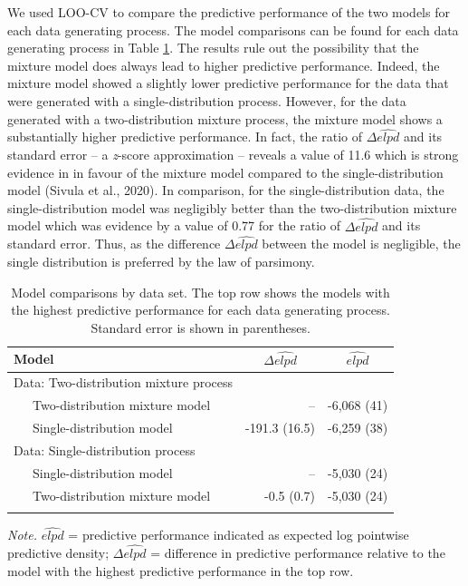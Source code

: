 \documentclass[
  man,floatsintext]{apa7}
\begin{document}
We used LOO-CV to compare the predictive performance of the two models for each data generating process. The model comparisons can be found for each data generating process in Table \ref{tab:loossim}. The results rule out the possibility that the mixture model does always lead to higher predictive performance. Indeed, the mixture model showed a slightly lower predictive performance for the data that were generated with a single-distribution process. However, for the data generated with a two-distribution mixture process, the mixture model shows a substantially higher predictive performance. In fact, the ratio of \(\Delta\widehat{elpd}\) and its standard error -- a \emph{z}-score approximation -- reveals a value of 11.6 which is strong evidence in in favour of the mixture model compared to the single-distribution model (Sivula et al., 2020). In comparison, for the single-distribution data, the single-distribution model was negligibly better than the two-distribution mixture model which was evidence by a value of 0.77 for the ratio of \(\Delta\widehat{elpd}\) and its standard error. Thus, as the difference \(\Delta\widehat{elpd}\) between the model is negligible, the single distribution is preferred by the law of parsimony.

\begin{table}[tbp]

\begin{center}
\begin{threeparttable}

\caption{\label{tab:loossim}Model comparisons by data set. The top row shows the models with the highest predictive performance for each data generating process. Standard error is shown in parentheses.}

\begin{tabular}{lrr}
\toprule
Model & \multicolumn{1}{c}{$\Delta\widehat{elpd}$} & \multicolumn{1}{c}{$\widehat{elpd}$}\\
\midrule
Data: Two-distribution mixture process &  & \\
\ \ \ Two-distribution mixture model & -- & -6,068 (41)\\
\ \ \ Single-distribution model & -191.3 (16.5) & -6,259 (38)\\
Data: Single-distribution process &  & \\
\ \ \ Single-distribution model & -- & -5,030 (24)\\
\ \ \ Two-distribution mixture model & -0.5 (0.7) & -5,030 (24)\\
\bottomrule
\addlinespace
\end{tabular}

\begin{tablenotes}[para]
\normalsize{\textit{Note.} $\widehat{elpd}$ = predictive performance indicated as expected log pointwise predictive density; $\Delta\widehat{elpd}$ = difference in predictive performance relative to the model with the highest predictive performance in the top row.}
\end{tablenotes}

\end{threeparttable}
\end{center}

\end{table}
\end{document}
